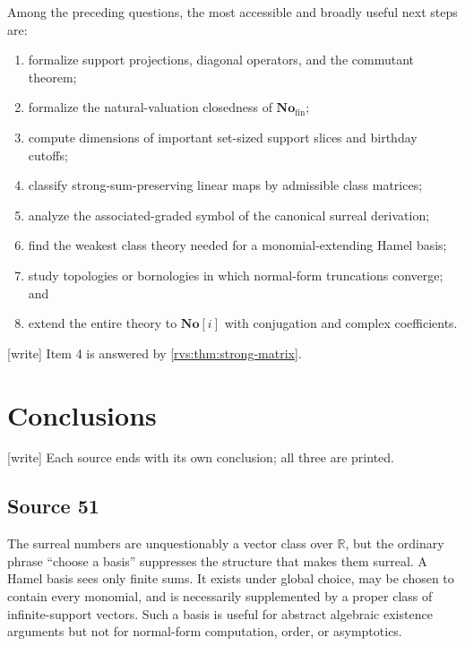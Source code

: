 \documentclass[11pt,letterpaper]{article}
\numberwithin{equation}{section}
\theoremstyle{definition}
\theoremstyle{remark}
\newcommand{\No}{\mathbf{No}}
\newcommand{\R}{\mathbb{R}}
\newcommand{\Fin}{\No_{\mathrm{fin}}}
\newcommand{\wtag}{\textup{[write]}}%
\begin{document}
Among the preceding questions, the most accessible and broadly useful next steps
are:
\begin{enumerate}[label=\arabic*.]
\item formalize support projections, diagonal operators, and the commutant theorem;
\item formalize the natural-valuation closedness of $\Fin$;
\item compute dimensions of important set-sized support slices and birthday cutoffs;
\item classify strong-sum-preserving linear maps by admissible class matrices;
\item analyze the associated-graded symbol of the canonical surreal derivation;
\item find the weakest class theory needed for a monomial-extending Hamel basis;
\item study topologies or bornologies in which normal-form truncations converge; and
\item extend the entire theory to $\No[i]$ with conjugation and complex coefficients.
\end{enumerate}

\noindent\wtag{} Item 4 is answered by \cref{rvs:thm:strong-matrix}.


\section{Conclusions}\label{rvs:sec:conclusion}\label{rvs:cv:sec:conclusion}

\wtag{} Each source ends with its own conclusion; all three are printed.

\subsection{Source 51}

The surreal numbers are unquestionably a vector class over \(\R\), but the
ordinary phrase ``choose a basis'' suppresses the structure that makes them
surreal.  A Hamel basis sees only finite sums.  It exists under global choice,
may be chosen to contain every monomial, and is necessarily supplemented by a
proper class of infinite-support vectors.  Such a basis is useful for abstract
algebraic existence arguments but not for normal-form computation, order, or
asymptotics.
\end{document}
